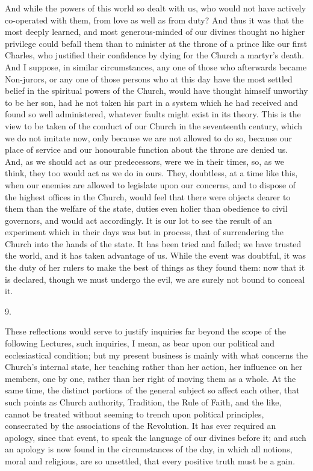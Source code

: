 And while the powers of this world so dealt with us, who would not
have actively co-operated with them, from love as well as from duty?
And thus it was that the most deeply learned, and most generous-minded
of our divines thought no higher privilege could befall them than to
minister at the throne of a prince like our first Charles, who
justified their confidence by dying for the Church a martyr's death.
And I suppose, in similar circumstances, any one of those who
afterwards became Non-jurors, or any one of those persons who at this
day have the most settled belief in the spiritual powers of the
Church, would have thought himself unworthy to be her son, had he not
taken his part in a system which he had received and found so well
administered, whatever faults might exist in its theory. This is the
view to be taken of the conduct of our Church in the seventeenth
century, which we do not imitate now, only because we are not allowed
to do so, because our place of service and our honourable function
about the throne are denied us. And, as we should act as our
predecessors, were we in their times, so, as we think, they too would
act as we do in ours. They, doubtless, at a time like this, when our
enemies are allowed to legislate upon our concerns, and to dispose of
the highest offices in the Church, would feel that there were
objects dearer to them than the welfare of the state, duties even
holier than obedience to civil governors, and would act accordingly.
It is our lot to see the result of an experiment which in their days
was but in process, that of surrendering the Church into the hands of
the state. It has been tried and failed; we have trusted the world,
and it has taken advantage of us. While the event was doubtful, it was
the duty of her rulers to make the best of things as they found them:
now that it is declared, though we must undergo the evil, we are
surely not bound to conceal it.

9.

These reflections would serve to justify inquiries far beyond the
scope of the following Lectures, such inquiries, I mean, as bear upon
our political and ecclesiastical condition; but my present business is
mainly with what concerns the Church's internal state, her teaching
rather than her action, her influence on her members, one by one,
rather than her right of moving them as a whole. At the same time, the
distinct portions of the general subject so affect each other, that
such points as Church authority, Tradition, the Rule of Faith, and the
like, cannot be treated without seeming to trench upon political
principles, consecrated by the associations of the Revolution. It has
ever required an apology, since that event, to speak the language of
our divines before it; and such an apology is now found in the
circumstances of the day, in which all notions, moral and religious,
are so unsettled, that every positive truth must be a gain.

